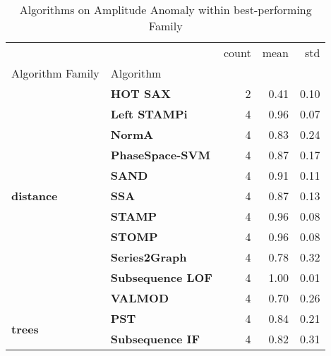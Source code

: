 \begin{table}[h]
\centering
\caption{Algorithms on Amplitude Anomaly within best-performing Family}
\label{tab:bp-amplitude}
\begin{tabular}{llrrr}
\toprule
 &  & count & mean & std \\
Algorithm Family & Algorithm &  &  &  \\
\midrule
\multirow[t]{11}{*}{\textbf{distance}} & \textbf{HOT SAX} & 2 & 0.41 & 0.10 \\
\textbf{} & \textbf{Left STAMPi} & 4 & 0.96 & 0.07 \\
\textbf{} & \textbf{NormA} & 4 & 0.83 & 0.24 \\
\textbf{} & \textbf{PhaseSpace-SVM} & 4 & 0.87 & 0.17 \\
\textbf{} & \textbf{SAND} & 4 & 0.91 & 0.11 \\
\textbf{} & \textbf{SSA} & 4 & 0.87 & 0.13 \\
\textbf{} & \textbf{STAMP} & 4 & 0.96 & 0.08 \\
\textbf{} & \textbf{STOMP} & 4 & 0.96 & 0.08 \\
\textbf{} & \textbf{Series2Graph} & 4 & 0.78 & 0.32 \\
\textbf{} & \textbf{Subsequence LOF} & 4 & 1.00 & 0.01 \\
\textbf{} & \textbf{VALMOD} & 4 & 0.70 & 0.26 \\
\cline{1-5}
\multirow[t]{2}{*}{\textbf{trees}} & \textbf{PST} & 4 & 0.84 & 0.21 \\
\textbf{} & \textbf{Subsequence IF} & 4 & 0.82 & 0.31 \\
\cline{1-5}
\bottomrule
\end{tabular}
\end{table}

